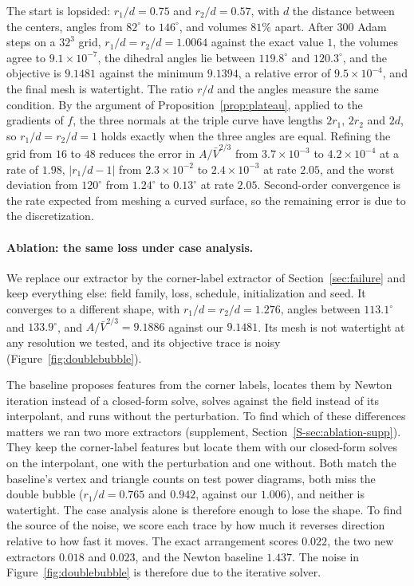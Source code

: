 \documentclass{egpubl}
\newcommand{\sref}[1]{\ref*{S-#1}}
\newcommand{\suppp}[1]{supplement, Section~\sref{#1}}
\theoremstyle{definition}
\begin{document}
The start is lopsided: $r_1/d = 0.75$ and $r_2/d = 0.57$, with
$d$ the distance between the centers, angles from $82^\circ$ to $146^\circ$,
and volumes $81\%$ apart. After $300$ Adam steps on a $32^3$ grid,
$r_1/d = r_2/d = 1.0064$ against the exact value $1$, the volumes agree to
$9.1\times10^{-7}$, the dihedral angles lie between $119.8^\circ$ and
$120.3^\circ$, and the objective is $9.1481$ against the minimum $9.1394$, a
relative error of $9.5\times10^{-4}$, and the final mesh is watertight. The
ratio $r/d$ and the angles measure the same condition. By the argument of
Proposition~\ref{prop:plateau}, applied to the gradients of $f$, the three
normals at the triple curve have lengths $2r_1$, $2r_2$ and $2d$, so $r_1/d = r_2/d = 1$ holds exactly when the
three angles are equal. Refining the grid from $16$ to $48$ reduces the error
in $A/\bar V^{2/3}$ from $3.7\times10^{-3}$ to $4.2\times10^{-4}$ at a rate
of $1.98$, $|r_1/d - 1|$ from $2.3\times10^{-2}$ to $2.4\times10^{-3}$ at rate
$2.05$, and the worst deviation from $120^\circ$ from $1.24^\circ$ to
$0.13^\circ$ at rate $2.05$. Second-order convergence is the rate expected
from meshing a curved surface, so the remaining error is due to the
discretization.

\paragraph{Ablation: the same loss under case analysis.} We replace our
extractor by the corner-label extractor of Section~\ref{sec:failure} and keep
everything else: field family, loss, schedule, initialization and seed. It
converges to a different shape, with $r_1/d = r_2/d = 1.276$, angles between
$113.1^\circ$ and $133.9^\circ$, and $A/\bar V^{2/3} = 9.1886$ against our
$9.1481$. Its mesh is not watertight at any resolution we tested, and its
objective trace is noisy (Figure~\ref{fig:doublebubble}).

The baseline proposes features from the corner labels, locates them by
Newton iteration instead of a closed-form solve, solves against the field
instead of its interpolant, and runs without the perturbation. To find which
of these differences matters we ran two more extractors
(\suppp{sec:ablation-supp}). They keep the corner-label features but locate
them with our closed-form solves on the interpolant, one with the perturbation
and one without. Both match the baseline's vertex and triangle counts on test
power diagrams, both miss
the double bubble ($r_1/d = 0.765$ and $0.942$, against our $1.006$), and
neither is watertight. The case analysis alone is therefore enough to lose the
shape. To find the source of the noise, we score each trace by how much it
reverses direction relative to how fast it moves. The exact arrangement scores
$0.022$, the two new extractors $0.018$ and $0.023$, and the Newton baseline
$1.437$. The noise in Figure~\ref{fig:doublebubble} is therefore due to the
iterative solver.
\end{document}
